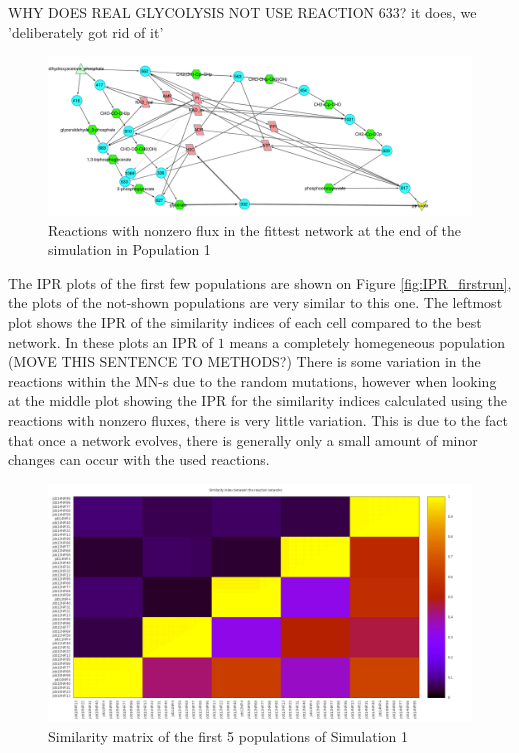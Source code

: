 \documentclass[10pt,a4paper]{article}
\begin{document}
WHY DOES REAL GLYCOLYSIS NOT USE REACTION 633? it does, we 'deliberately got rid of it'
\begin{figure}[htpb]
	\centering
	\includegraphics[width=1\linewidth]{trunk_glyc_final_job1.pdf}
	\caption{Reactions with nonzero flux in the fittest network at the end of the simulation in Population 1}
	\label{fig:trunk_glyc_final_job1}
\end{figure}



The IPR plots of the first few populations are shown on Figure \ref{fig:IPR_firstrun}, the plots of the not-shown populations are very similar to this one. The leftmost plot shows the IPR of the similarity indices of each cell compared to the best network. In these plots an IPR of $1$ means a completely homegeneous population (MOVE THIS SENTENCE TO METHODS?) There is some variation in the reactions within the MN-s due to the random mutations, however when looking at the middle plot showing the IPR for the similarity indices calculated using the reactions with nonzero fluxes, there is very little variation. This is due to the fact that once a network evolves, there is generally only a small amount of minor changes can occur with the used reactions. 

\begin{figure}[htpb]
	\centering
	\includegraphics[width=1\linewidth]{simmatrix_firstjob.png}
	\caption{Similarity matrix of the first 5 populations of Simulation 1}
	\label{fig:simmatrix_firstjob}
\end{figure}
\end{document}
